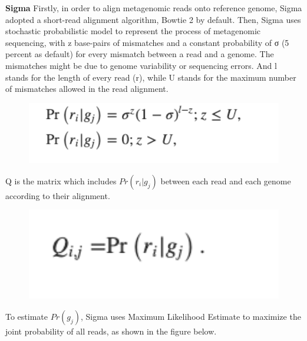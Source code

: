 \textbf{Sigma} Firstly, in order to align metagenomic reads onto reference genome, Sigma adopted a short-read alignment algorithm, Bowtie 2 \cite{LangmeadSalzberg2012} by default. Then, Sigma uses stochastic probabilistic model to represent the process of metagenomic sequencing, with z base-pairs of mismatches and a constant probability of σ (5 percent as default) for every mismatch between a read and a genome. The mismatches might be due to genome variability or sequencing errors. And l stands for the length of every read (r), while U stands for the maximum number of mismatches allowed in the read alignment. 
\begin{figure}
    \centering
    \includegraphics[width=12cm]{Images/sigma1.png}
    \label{fig:sigma1.png}
\end{figure}
Q is the matrix which includes $Pr(r_i|g_j)$ between each read and each genome according to their alignment.
\begin{figure}
    \centering
    \includegraphics[width=12cm]{Images/sigma2}
    \label{fig:sigma2.png}
\end{figure}
To estimate $Pr(g_j)$, Sigma uses Maximum Likelihood Estimate to maximize the joint probability of all reads, as shown in the figure below.
